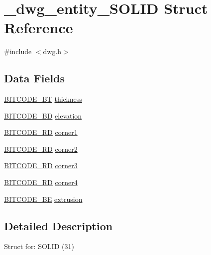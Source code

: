 \hypertarget{struct__dwg__entity__SOLID}{\section{\-\_\-dwg\-\_\-entity\-\_\-\-S\-O\-L\-I\-D \-Struct \-Reference}
\label{struct__dwg__entity__SOLID}
}


{\ttfamily \#include $<$dwg.\-h$>$}

\subsection*{\-Data \-Fields}
\begin{DoxyCompactItemize}
\item 
\hyperlink{dwg_8h_afc93a5ddc38aeff965d4e93c71514495}{\-B\-I\-T\-C\-O\-D\-E\-\_\-\-B\-T} \hyperlink{struct__dwg__entity__SOLID_a88f311e6fd279eb4798928b2e32bf1a2}{thickness}
\item 
\hyperlink{dwg_8h_a3c1e6781466b74ba07785d57da70ed97}{\-B\-I\-T\-C\-O\-D\-E\-\_\-\-B\-D} \hyperlink{struct__dwg__entity__SOLID_a3b2bdde8d317a95572a20b42d952271e}{elevation}
\item 
\hyperlink{dwg_8h_a1d23a9bc9a02453876b244dc6706f6a6}{\-B\-I\-T\-C\-O\-D\-E\-\_\-R\-D} \hyperlink{struct__dwg__entity__SOLID_ab2fa34577c33c181ed13e172a48640db}{corner1}
\item 
\hyperlink{dwg_8h_a1d23a9bc9a02453876b244dc6706f6a6}{\-B\-I\-T\-C\-O\-D\-E\-\_\-R\-D} \hyperlink{struct__dwg__entity__SOLID_aed6643fc779995634119ce4eceb5e233}{corner2}
\item 
\hyperlink{dwg_8h_a1d23a9bc9a02453876b244dc6706f6a6}{\-B\-I\-T\-C\-O\-D\-E\-\_\-R\-D} \hyperlink{struct__dwg__entity__SOLID_adb6e26154430c21e5e44a2ce7c6f6bf0}{corner3}
\item 
\hyperlink{dwg_8h_a1d23a9bc9a02453876b244dc6706f6a6}{\-B\-I\-T\-C\-O\-D\-E\-\_\-R\-D} \hyperlink{struct__dwg__entity__SOLID_aadf7003b10f1ac31994730810163a970}{corner4}
\item 
\hyperlink{dwg_8h_ac2622137c01aa3a719ec6c571d06ee6a}{\-B\-I\-T\-C\-O\-D\-E\-\_\-\-B\-E} \hyperlink{struct__dwg__entity__SOLID_aace62250e0b87a934707e97d1d5e186f}{extrusion}
\end{DoxyCompactItemize}


\subsection{\-Detailed \-Description}
\-Struct for\-: \-S\-O\-L\-I\-D (31) 

